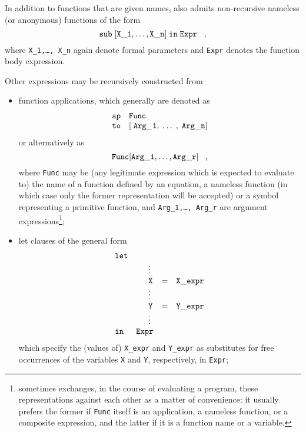In addition to functions that are given names, \kir also
admits non-recursive {\mys nameless} (or {\mys anonymous)
functions} of the form
$$
{\tt sub\; [X\_1,\ldots, X\_n]\; in\;Expr}\;\;\;,
$$
where {\tt X\_1,\ldots, X\_n} again denote formal parameters
and {\tt Expr} denotes the function body expression.

Other expressions may be recursively constructed from
\begin{itemize}
\item {\mys function applications},
which generally are denoted as
$$
\begin{array}{rl}
{\tt ap} & {\tt Func} \\
{\tt to} & {\tt [\;Arg\_1,\;\ldots\;,\;Arg\_n]}
\end{array}
$$
or alternatively as
$$
 {\tt Func[Arg\_1,\ldots, Arg\_r]}\;\;\;,
$$
where {\tt Func} may be (any legitimate \kir expression which
is expected to evaluate to)  the name of a function defined
by an equation, a nameless function (in which case only the
former representation will be accepted)
or a symbol representing a primitive function, and
{\tt Arg\_1,\ldots, Arg\_r} are argument expressions\footnote{\pired sometimes exchanges, in the course of evaluating a program,
 these representations against each other as a matter of convenience:
 it usually prefers the former if {\tt Func} itself is an application, a
nameless function, or a composite expression, and the latter if it is a function name or
a variable.};
\item
\arraycolsep 2pt
{\sc let} {\mys clauses} of the general form
$$
\begin{array}{llcl}
{\tt let} & \; & \; & \;
\\ &\phantom{{\sc in}\;\;}\vdots \\
&\phantom{{\sc in}\;\;}{\tt X}&=&{\tt X\_expr} \\
&\phantom{{\sc in}\;\;}\vdots\\
&\phantom{{\sc in}\;\;}{\tt Y}&=&{\tt Y\_expr} \\
&\phantom{{\sc in}\;\;}\vdots \\
{\tt in} \; & {\tt Expr} & \;&\;
\end{array}
$$
which specify the (values of) {\tt X\_expr} and {\tt Y\_expr} as substitutes
for free occurrences of the variables {\tt X} and {\tt Y}, respectively,
in {\tt Expr};
\arraycolsep 5pt

\end{itemize}
